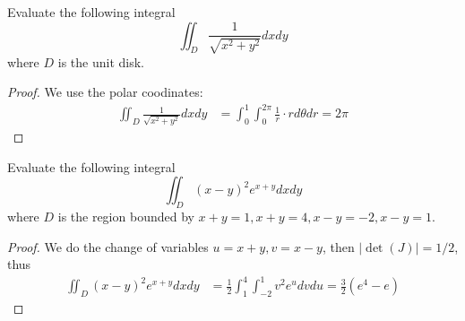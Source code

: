 \documentclass[openany]{book}
\begin{document}



\begin{prob}
    Evaluate the following integral 
    \begin{equation*}
        \iint_D\frac{1}{\sqrt{x^2+y^2}}dxdy
    \end{equation*}
    where $D$ is the unit disk.
\end{prob}
\begin{proof}
    We use the polar coodinates:
    \begin{align*}
        \iint_D\frac{1}{\sqrt{x^2+y^2}}dxdy&=\int_0^1\int_0^{2\pi}\frac{1}{r}\cdot rd\theta dr=2\pi
    \end{align*}
\end{proof}


\begin{prob}
    Evaluate the following integral 
    \begin{equation*}
        \iint_D (x-y)^2e^{x+y}dxdy
    \end{equation*}
    where $D$ is the region bounded by $x+y=1, x+y=4, x-y=-2, x-y=1$.
\end{prob}
\begin{proof}
    We do the change of variables $u=x+y, v=x-y$, then $|\det(J)|=1/2$, thus 
    \begin{align*}
        \iint_D (x-y)^2e^{x+y}dxdy&=\frac{1}{2}\int_1^4\int_{-2}^1 v^2e^u dvdu=\frac{3}{2}(e^4-e)
    \end{align*}
\end{proof}
\end{document}
